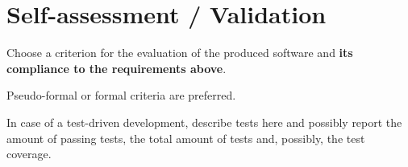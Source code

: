 \section{Self-assessment / Validation}

Choose a criterion for the evaluation of the produced software and \textbf{its compliance to the requirements above}.

Pseudo-formal or formal criteria are preferred.

In case of a test-driven development, describe tests here and possibly report the amount of passing tests, the total amount of tests and, possibly, the test coverage.
